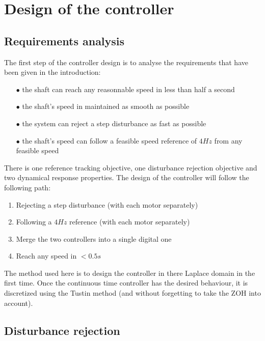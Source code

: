 \setcounter{secnumdepth}{2}

\chapter{Design of the controller}

\section{Requirements analysis}

The first step of the controller design is to analyse the requirements that have been given in the introduction:

\begin{enumerate}
    \item[$\bullet$] the shaft can reach any reasonnable speed in less than half a second
    \item[$\bullet$] the shaft's speed in maintained as smooth as possible
    \item[$\bullet$] the system can reject a step disturbance as fast as possible
    \item[$\bullet$] the shaft's speed can follow a feasible speed reference of $4 Hz$ from any feasible speed
\end{enumerate}

There is one reference tracking objective, one disturbance rejection objective and two dynamical response properties.
The design of the controller will follow the following path:

\begin{enumerate}
    \item Rejecting a step disturbance (with each motor separately)
    \item Following a $4 Hz$ reference (with each motor separately)
    \item Merge the two controllers into a single digital one
    \item Reach any speed in $< 0.5 s$
\end{enumerate}

The method used here is to design the controller in there Laplace domain in the first time. Once the continuous time
controller has the desired behaviour, it is discretized using the Tustin method (and without forgetting to take the
ZOH into account).

\section{Disturbance rejection}

